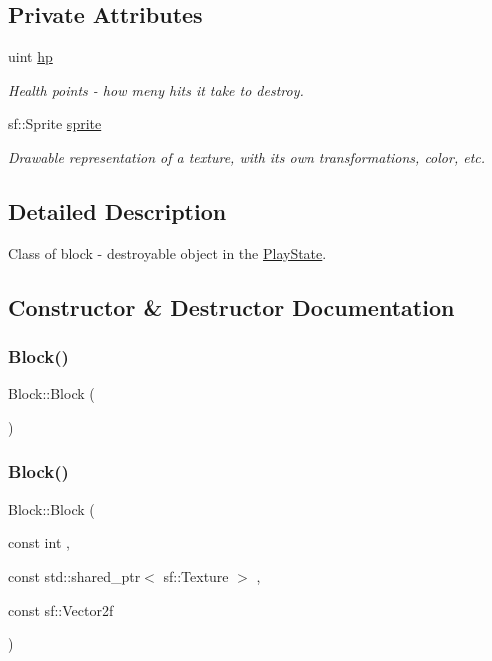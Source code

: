 \subsection*{Private Attributes}
\begin{DoxyCompactItemize}
\item 
uint \mbox{\hyperlink{class_block_a8b1d6db0268d1e54f55c8824cbb429f2}{hp}}
\begin{DoxyCompactList}\small\item\em Health points -\/ how meny hits it take to destroy. \end{DoxyCompactList}\item 
sf\+::\+Sprite \mbox{\hyperlink{class_block_a0fb8279435ff1a353df3170f26428bff}{sprite}}
\begin{DoxyCompactList}\small\item\em Drawable representation of a texture, with its own transformations, color, etc. \end{DoxyCompactList}\end{DoxyCompactItemize}


\subsection{Detailed Description}
Class of block -\/ destroyable object in the \mbox{\hyperlink{class_play_state}{Play\+State}}. 

\subsection{Constructor \& Destructor Documentation}
\mbox{\label{class_block_a37658a946bf5067ad01d68d9ff086adc}} 
\subsubsection{\texorpdfstring{Block()}{Block()}\hspace{0.1cm}{\footnotesize\ttfamily [1/2]}}
{\footnotesize\ttfamily Block\+::\+Block (\begin{DoxyParamCaption}{ }\end{DoxyParamCaption})}

\mbox{\label{class_block_a6e2109c914d77166f2879944da582e7a}} 
\subsubsection{\texorpdfstring{Block()}{Block()}\hspace{0.1cm}{\footnotesize\ttfamily [2/2]}}
{\footnotesize\ttfamily Block\+::\+Block (\begin{DoxyParamCaption}\item[{const int}]{,  }\item[{const std\+::shared\+\_\+ptr$<$ sf\+::\+Texture $>$}]{,  }\item[{const sf\+::\+Vector2f}]{ }\end{DoxyParamCaption})}



